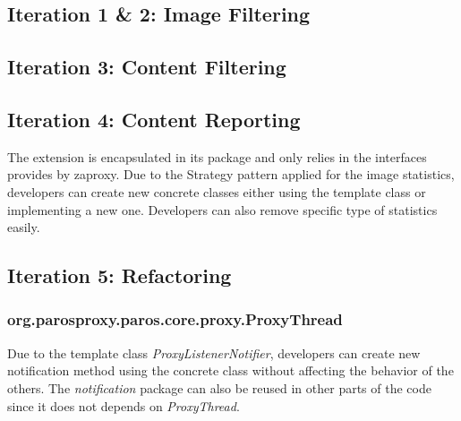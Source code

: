 \subsection{Iteration 1 \& 2: Image Filtering}
\subsection{Iteration 3: Content Filtering}
\subsection{Iteration 4: Content Reporting}
The extension is encapsulated in its package and only relies in the interfaces provides by zaproxy. Due to the Strategy pattern applied for the image statistics, developers can create new concrete classes either using the template class or implementing a new one. Developers can also remove specific type of statistics easily.

\subsection{Iteration 5: Refactoring}

\subsubsection{org.parosproxy.paros.core.proxy.ProxyThread}

Due to the template class \textit{ProxyListenerNotifier}, developers can create new notification method using the concrete class without affecting the behavior of the others. The \textit{notification} package can also be reused in other parts of the code since it does not depends on \textit{ProxyThread}. 
